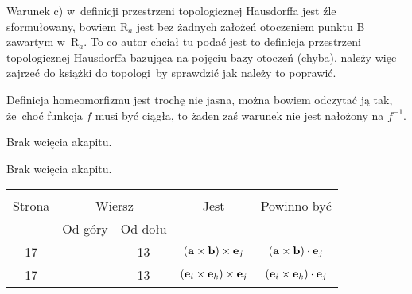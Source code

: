 \documentclass[a4paper,11pt]{article}
\numberwithin{equation}{section}
\begin{document}


 Warunek c) w~definicji przestrzeni topologicznej Hausdorffa jest
źle sformułowany, bowiem $\mathrm{R}_{ a }$ jest bez żadnych założeń
otoczeniem punktu B zawartym w~$\mathrm{R}_{ a }$. To co autor chciał tu
podać jest to definicja przestrzeni topologicznej Hausdorffa bazująca na
pojęciu bazy otoczeń (chyba), należy więc zajrzeć do książki do
topologi~by sprawdzić jak należy to poprawić.

\VerSpaceFour





Definicja homeomorfizmu jest trochę nie jasna, można bowiem odczytać ją
tak, że~choć funkcja $f$ musi być ciągła, to żaden zaś warunek nie jest
nałożony na $f^{ -1 }$.

\VerSpaceFour





 Brak wcięcia akapitu.

\VerSpaceFour





 Brak wcięcia akapitu.

\VerSpaceFour






\newpage



\begin{center}

  \begin{tabular}{|c|c|c|c|c|}
    \hline
    & \multicolumn{2}{c|}{} & & \\
    Strona & \multicolumn{2}{c|}{Wiersz} & Jest
                              & Powinno być \\ \cline{2-3}
    & Od góry & Od dołu &  &  \\ \hline
    17 & & 13 & $( \mathbf{a} \times \mathbf{b} ) \times \mathbf{e}_{ j }$
           & $( \mathbf{a} \times \mathbf{b} ) \cdot \mathbf{e}_{ j }$ \\
    17 & & 13 & $( \mathbf{e}_{ i } \times \mathbf{e}_{ k } ) \times \mathbf{e}_{ j }$
           & $( \mathbf{e}_{ i } \times \mathbf{e}_{ k } ) \cdot \mathbf{e}_{ j }$ \\
    \hline
  \end{tabular}

\end{center}
\end{document}
